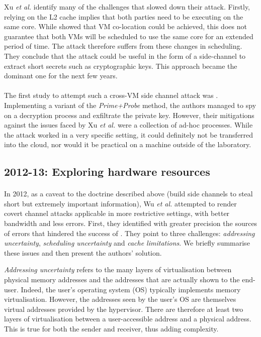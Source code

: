 \documentclass[orivec,envcountsame, a4paper, 11pt]{llncs}
\begin{document}
Xu \textit{et al.} \cite{Xu2011} identify many of the challenges that slowed down their attack. Firstly, relying on the L2 cache implies that both parties need to be executing on the same core. While \cite{Ristenpart2009} showed that VM co-location could be achieved, this does not guarantee that both VMs will be scheduled to use the same core for an extended period of time. The attack therefore suffers from these changes in scheduling. They conclude that the attack could be useful in the form of a side-channel to extract short secrets such as cryptographic keys. This approach became the dominant one for the next few years.

\paragraph{} The first study to attempt such a cross-VM side channel attack was \cite{Zhang2012}. Implementing a variant of the \textit{Prime+Probe} method, the authors managed to spy on a decryption process and exfiltrate the private key. However, their mitigations against the issues faced by Xu \textit{et al.} \cite{Xu2011} were a collection of ad-hoc processes. While the attack worked in a very specific setting, it could definitely not be transferred into the cloud, nor would it be practical on a machine outside of the laboratory.


\subsection{2012-13: Exploring hardware resources}
\label{sec:membus}

\paragraph{} In 2012, as a caveat to the doctrine described above (build side channels to steal short but extremely important information), Wu \textit{et al.} \cite{Wu2012} attempted to render covert channel attacks applicable in more restrictive settings, with better bandwidth and less errors. First, they identified with greater precision the sources of errors that hindered the success of \cite{Xu2011}. They point to three challenges: \textit{addressing uncertainty}, \textit{scheduling uncertainty} and \textit{cache limitations}. We briefly summarise these issues and then present the authors' solution.

\textit{Addressing uncertainty} refers to the many layers of virtualisation between physical memory addresses and the addresses that are actually shown to the end-user. Indeed, the user's operating system (OS) typically implements memory virtualisation. However, the addresses seen by the user's OS are themselves virtual addresses provided by the hypervisor. There are therefore at least two layers of virtualisation between a user-accessible address and a physical address. This is true for both the sender and receiver, thus adding complexity.
\end{document}
